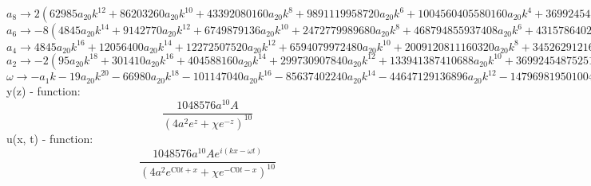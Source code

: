 \documentclass[12pt,a4paper,draft]{article}
\begin{document}
$a_{8}\to 2 \left(62985 a_{20} k^{12}+86203260 a_{20} k^{10}+43392080160 a_{20} k^8+9891119958720 a_{20} k^6+1004560405580160 a_{20} k^4+36992454875251200 a_{20} k^2+221137393247019008 a_{20}\right)$\\
$a_{6}\to -8 \left(4845 a_{20} k^{14}+9142770 a_{20} k^{12}+6749879136 a_{20} k^{10}+2472779989680 a_{20} k^8+468794855937408 a_{20} k^6+43157864021126400 a_{20} k^4+1547961752729133056 a_{20} k^2+9725860232374353920 a_{20}\right)$\\
$a_{4}\to 4845 a_{20} k^{16}+12056400 a_{20} k^{14}+12272507520 a_{20} k^{12}+6594079972480 a_{20} k^{10}+2009120811160320 a_{20} k^8+345262912169011200 a_{20} k^6+30959235054582661120 a_{20} k^4+1167103227884922470400 a_{20} k^2+8542922993365665447936 a_{20}$\\
$a_{2}\to -2 \left(95 a_{20} k^{18}+301410 a_{20} k^{16}+404588160 a_{20} k^{14}+299730907840 a_{20} k^{12}+133941387410688 a_{20} k^{10}+36992454875251200 a_{20} k^8+6191847010916532224 a_{20} k^6+583551613942461235200 a_{20} k^4+25628768980096996343808 a_{20} k^2+263539423074198749184000 a_{20}\right)$\\
$\omega \to -a_{1} k-19 a_{20} k^{20}-66980 a_{20} k^{18}-101147040 a_{20} k^{16}-85637402240 a_{20} k^{14}-44647129136896 a_{20} k^{12}-14796981950100480 a_{20} k^{10}-3095923505458266112 a_{20} k^8-389034409294974156800 a_{20} k^6-25628768980096996343808 a_{20} k^4-527078846148397498368000 a_{20} k^2+13835476912905325117440000 a_{20}$\\


y(z) - function:
$$
\frac{1048576 a^{10} A}{\left(4 a^2 e^z+\chi  e^{-z}\right)^{10}}
$$
u(x, t) - function:
$$
\frac{1048576 a^{10} A e^{i (k x-\omega  t)}}{\left(4 a^2 e^{\text{C0} t+x}+\chi  e^{-\text{C0} t-x}\right)^{10}}
$$
\end{document}
